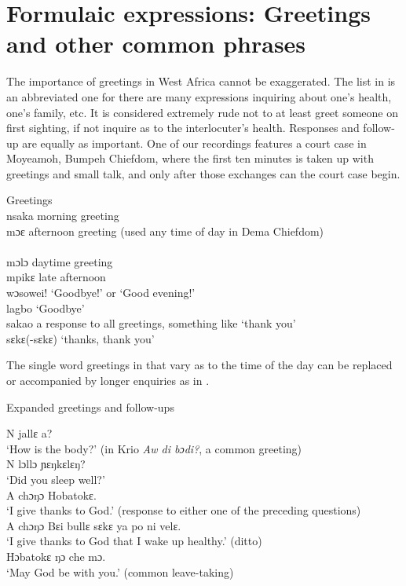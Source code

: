 \section{Formulaic expressions: Greetings and other common phrases}
\label{sec:10.2}\hypertarget{Toc115517825}{}
The importance of greetings in West Africa cannot be exaggerated. The list in  is an abbreviated one for there are many expressions inquiring about one's health, one's family, etc. It is considered extremely rude not to at least greet someone on first sighting, if not inquire as to the interlocuter's health. Responses and follow-up are equally as important. One of our recordings features a court case in Moyeamoh, Bumpeh Chiefdom, where the first ten minutes is taken up with greetings and small talk, and only after those exchanges can the court case begin.

\TabPositions{2cm,3cm,6cm,8cm}

\ea%
    \label{ex:246}
    Greetings\\
      nsaka \tab morning greeting\\
      mɔɛ \tab afternoon greeting (used any time of day in Dema Chiefdom)\\ \tab \\
      mɔlɔ \tab daytime greeting\\
      mpikɛ \tab late afternoon\\
      wɔsowei! \tab ‘Goodbye!' or ‘Good evening!'\\
      lagbo \tab ‘Goodbye'\\
      sakao \tab a response to all greetings, something like ‘thank you'\\
      sɛkɛ(-sɛkɛ) \tab ‘thanks, thank you'\\
\z

The single word greetings in  that vary as to the time of the day can be replaced or accompanied by longer enquiries as in .

\ea%
    \label{ex:247}
    Expanded greetings and follow-ups
    
\ea N jallɛ a?\\
‘How is the body?' (in Krio \textit{Aw di bɔdi?}, a common greeting)\\
\vspace{6pt}
\ex N lɔllɔ ɲɛŋkɛlɛŋ?\\
‘Did you sleep well?'\\
\vspace{6pt}
\ex A chɔŋɔ Hobatokɛ.\\
‘I give thanks to God.' (response to either one of the preceding questions)\\
\vspace{6pt}
\ex A chɔŋɔ Bɛi bullɛ sɛkɛ ya po ni velɛ.\\
‘I give thanks to God that I wake up healthy.' (ditto)\\
\vspace{6pt}
\ex Hɔbatokɛ ŋɔ che mɔ.\\
‘May God be with you.' (common leave-taking)
\z
\z


